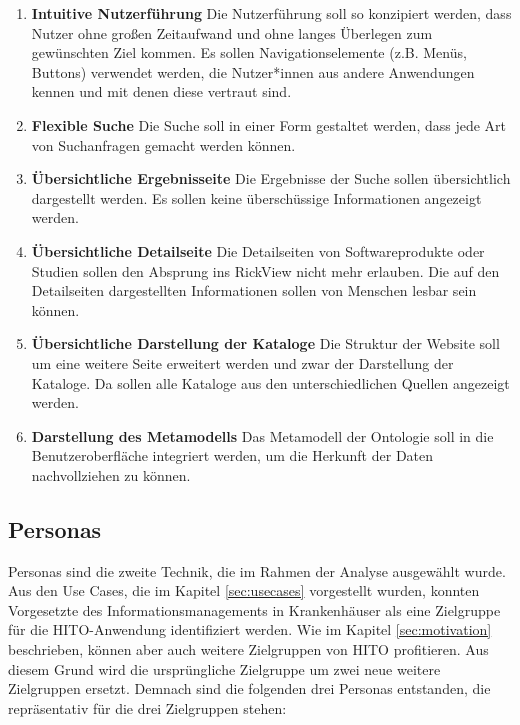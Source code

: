 \begin{enumerate}
\item \textbf{Intuitive Nutzerführung} \newline
Die Nutzerführung soll so konzipiert werden, dass Nutzer ohne großen Zeitaufwand und ohne langes Überlegen zum gewünschten Ziel kommen. 
Es sollen Navigationselemente (z.B. Menüs, Buttons) verwendet werden, die Nutzer*innen aus andere Anwendungen kennen und mit denen diese vertraut sind.
\item \textbf{Flexible Suche} \newline
Die Suche soll in einer Form gestaltet werden, dass jede Art von Suchanfragen gemacht werden können.
\item \textbf{\"Ubersichtliche Ergebnisseite} \newline
Die Ergebnisse der Suche sollen übersichtlich dargestellt werden.
Es sollen keine überschüssige Informationen angezeigt werden.
\item \textbf{\"Ubersichtliche Detailseite} \newline
Die Detailseiten von Softwareprodukte oder Studien sollen den Absprung ins RickView nicht mehr erlauben.
Die auf den Detailseiten dargestellten Informationen sollen von Menschen lesbar sein können.
\item \textbf{\"Ubersichtliche Darstellung der Kataloge} \newline
Die Struktur der Website soll um eine weitere Seite erweitert werden und zwar der Darstellung der Kataloge.
Da sollen alle Kataloge aus den unterschiedlichen Quellen angezeigt werden.
\item \textbf{Darstellung des Metamodells} \newline
Das Metamodell der Ontologie soll in die Benutzeroberfläche integriert werden, um die Herkunft der Daten nachvollziehen zu können.
\end{enumerate}

\subsection{Personas}

Personas sind die zweite Technik, die im Rahmen der Analyse ausgewählt wurde.
Aus den Use Cases, die im Kapitel \ref{sec:usecases} vorgestellt wurden, konnten Vorgesetzte des Informationsmanagements in Krankenhäuser als eine Zielgruppe für die HITO-Anwendung identifiziert werden.
Wie im Kapitel \ref{sec:motivation} beschrieben, können aber auch weitere Zielgruppen von HITO profitieren.
Aus diesem Grund wird die ursprüngliche Zielgruppe um zwei neue weitere Zielgruppen ersetzt.
Demnach sind die folgenden drei Personas entstanden, die repräsentativ für die drei Zielgruppen stehen:

